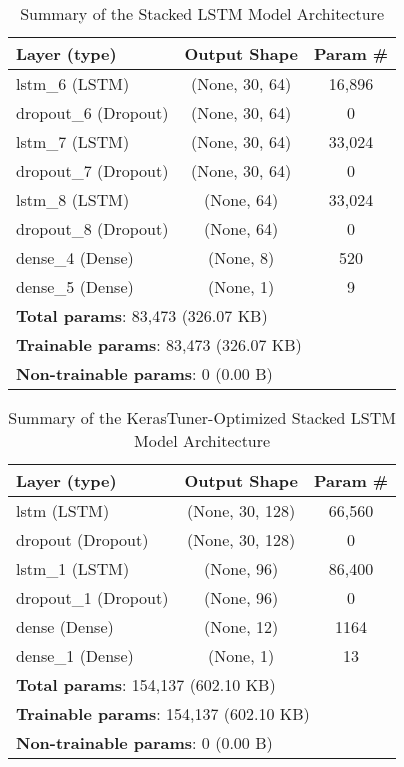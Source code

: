 \documentclass[letterpaper]{article}
\begin{document}
\begin{table}[h]
\centering
\caption{Summary of the Stacked LSTM Model Architecture}
\begin{tabular}{lcc}
\toprule
\textbf{Layer (type)} & \textbf{Output Shape} & \textbf{Param \#} \\
\midrule
lstm\_6 (LSTM) & (None, 30, 64) & 16,896 \\
dropout\_6 (Dropout) & (None, 30, 64) & 0 \\
lstm\_7 (LSTM) & (None, 30, 64) & 33,024 \\
dropout\_7 (Dropout) & (None, 30, 64) & 0 \\
lstm\_8 (LSTM) & (None, 64) & 33,024 \\
dropout\_8 (Dropout) & (None, 64) & 0 \\
dense\_4 (Dense) & (None, 8) & 520 \\
dense\_5 (Dense) & (None, 1) & 9 \\
\midrule
\multicolumn{3}{l}{\textbf{Total params}: 83,473 (326.07 KB)} \\
\multicolumn{3}{l}{\textbf{Trainable params}: 83,473 (326.07 KB)} \\
\multicolumn{3}{l}{\textbf{Non-trainable params}: 0 (0.00 B)} \\
\bottomrule
\end{tabular}
\label{tab:S_LSTM_arch}
\end{table}

\begin{table}[h]
\centering
\caption{Summary of the KerasTuner-Optimized Stacked LSTM Model Architecture}
\begin{tabular}{lcc}
\toprule
\textbf{Layer (type)} & \textbf{Output Shape} & \textbf{Param \#} \\
\midrule
lstm (LSTM) & (None, 30, 128) & 66,560 \\
dropout (Dropout) & (None, 30, 128) & 0 \\
lstm\_1 (LSTM) & (None, 96) & 86,400 \\
dropout\_1 (Dropout) & (None, 96) & 0 \\
dense (Dense) & (None, 12) & 1164 \\
dense\_1 (Dense) & (None, 1) & 13 \\
\midrule
\multicolumn{3}{l}{\textbf{Total params}: 154,137 (602.10 KB)} \\
\multicolumn{3}{l}{\textbf{Trainable params}: 154,137 (602.10 KB)} \\
\multicolumn{3}{l}{\textbf{Non-trainable params}: 0 (0.00 B)} \\
\bottomrule
\end{tabular}
\label{tab:S_LSTM_KT_arch}
\end{table}
\end{document}
